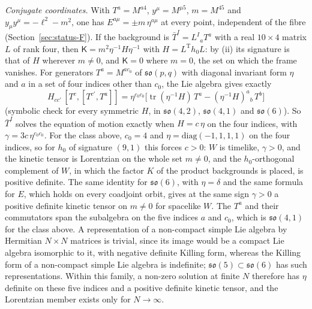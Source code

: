 \emph{Conjugate coordinates.} With \(T^a=M^{a4}\), \(y^\mu=M^{\mu5}\), \(m=M^{45}\) and \(y_\mu y^\mu=-\ell^2-m^2\), one has \(E^{a\mu}=\pm m\,\eta^{a\mu}\) at every point, independent of the fibre (Section~\ref{sec:status-F}). If the background is \(\bar T^I=L^I{}_aT^a\) with a real \(10\times4\) matrix \(L\) of rank four, then \(\mathsf K=m^2\eta^{-1}H\eta^{-1}\) with \(H=L^{\mathrm T}h_0L\): by (ii) its signature is that of \(H\) wherever \(m\neq0\), and \(\mathsf K=0\) where \(m=0\), the set on which the frame vanishes. For generators \(T^a=M^{ac_0}\) of \(\mathfrak{so}(p,q)\) with diagonal invariant form \(\eta\) and \(a\) in a set of four indices other than \(c_0\), the Lie algebra gives exactly
\[
H_{cc'}\,[T^c,[T^{c'},T^a]]=\eta^{c_0c_0}\bigl[\operatorname{tr}(\eta^{-1}H)\,T^a-(\eta^{-1}H)^a{}_b\,T^b\bigr]
\]
(symbolic check for every symmetric \(H\), in \(\mathfrak{so}(4,2)\), \(\mathfrak{so}(4,1)\) and \(\mathfrak{so}(6)\)). So \(\bar T^I\) solves the equation of motion exactly when \(H=c\,\eta\) on the four indices, with \(\gamma=3c\,\eta^{c_0c_0}\). For the class above, \(c_0=4\) and \(\eta=\mathrm{diag}(-1,1,1,1)\) on the four indices, so for \(h_0\) of signature \((9,1)\) this forces \(c>0\): \(W\) is timelike, \(\gamma>0\), and the kinetic tensor is Lorentzian on the whole set \(m\neq0\), and the \(h_0\)-orthogonal complement of \(W\), in which the factor \(K\) of the product backgrounds is placed, is positive definite. The same identity for \(\mathfrak{so}(6)\), with \(\eta=\delta\) and the same formula for \(E\), which holds on every coadjoint orbit, gives at the same sign \(\gamma>0\) a positive definite kinetic tensor on \(m\neq0\) for spacelike \(W\). The \(T^a\) and their commutators span the subalgebra on the five indices \(a\) and \(c_0\), which is \(\mathfrak{so}(4,1)\) for the class above. A representation of a non-compact simple Lie algebra by Hermitian \(N\times N\) matrices is trivial, since its image would be a compact Lie algebra isomorphic to it, with negative definite Killing form, whereas the Killing form of a non-compact simple Lie algebra is indefinite; \(\mathfrak{so}(5)\subset\mathfrak{so}(6)\) has such representations. Within this family, a non-zero solution at finite \(N\) therefore has \(\eta\) definite on these five indices and a positive definite kinetic tensor, and the Lorentzian member exists only for \(N\to\infty\).

